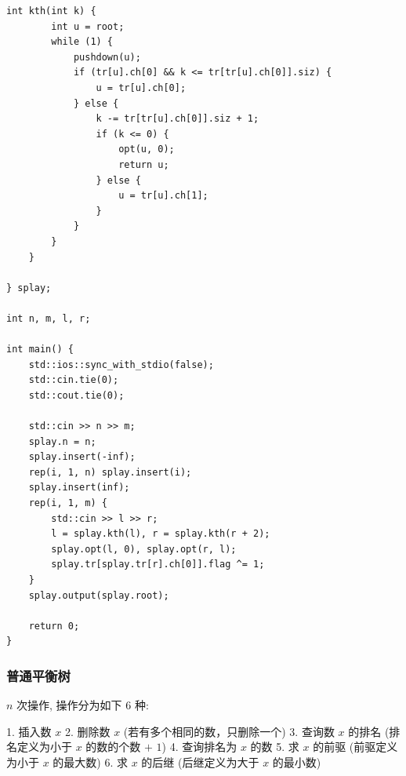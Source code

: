 \documentclass[UTF8, a4paper, titlepage, twoside]{ctexart}
\begin{document}
\begin{lstlisting}[style=cpp]
    int kth(int k) {
        int u = root;
        while (1) {
            pushdown(u);
            if (tr[u].ch[0] && k <= tr[tr[u].ch[0]].siz) {
                u = tr[u].ch[0];
            } else {
                k -= tr[tr[u].ch[0]].siz + 1;
                if (k <= 0) {
                    opt(u, 0);
                    return u;
                } else {
                    u = tr[u].ch[1];
                }
            }
        }
    }

} splay;

int n, m, l, r;

int main() {
    std::ios::sync_with_stdio(false);
    std::cin.tie(0);
    std::cout.tie(0);

    std::cin >> n >> m;
    splay.n = n;
    splay.insert(-inf);
    rep(i, 1, n) splay.insert(i);
    splay.insert(inf);
    rep(i, 1, m) {
        std::cin >> l >> r;
        l = splay.kth(l), r = splay.kth(r + 2);
        splay.opt(l, 0), splay.opt(r, l);
        splay.tr[splay.tr[r].ch[0]].flag ^= 1;
    }
    splay.output(splay.root);

    return 0;
}
\end{lstlisting}

\subsubsection*{ 普通平衡树 }

$n$ 次操作, 操作分为如下 $6$ 种:

1. 插入数 $x$
2. 删除数 $x$ (若有多个相同的数，只删除一个)
3. 查询数 $x$ 的排名 (排名定义为小于 $x$ 的数的个数 $+$ $1$)
4. 查询排名为 $x$ 的数
5. 求 $x$ 的前驱 (前驱定义为小于 $x$ 的最大数)
6. 求 $x$ 的后继 (后继定义为大于 $x$ 的最小数)
\end{document}
